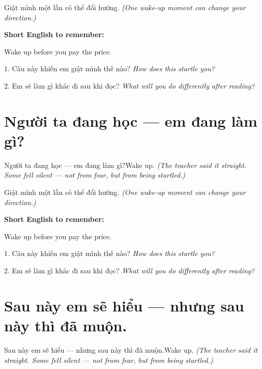 \begin{baihoc}
Giật mình một lần có thể đổi hướng.
\textit{(One wake-up moment can change your direction.)}
\end{baihoc}

\begin{ghinhoanh}
\textbf{Short English to remember:}

Wake up before you pay the price.

\end{ghinhoanh}

\begin{tuhocnhanh}
1. Câu này khiến em giật mình thế nào? \textit{How does this startle you?}

2. Em sẽ làm gì khác đi sau khi đọc? \textit{What will you do differently after reading?}
\end{tuhocnhanh}
\ngancach


\section{Người ta đang học — em đang làm gì?}
\begin{truyen}{Người ta đang học — em đang làm gì?}{Wake up.}
\textit{(The teacher said it straight. Some fell silent — not from fear, but from being startled.)}
\end{truyen}

\begin{baihoc}
Giật mình một lần có thể đổi hướng.
\textit{(One wake-up moment can change your direction.)}
\end{baihoc}

\begin{ghinhoanh}
\textbf{Short English to remember:}

Wake up before you pay the price.

\end{ghinhoanh}

\begin{tuhocnhanh}
1. Câu này khiến em giật mình thế nào? \textit{How does this startle you?}

2. Em sẽ làm gì khác đi sau khi đọc? \textit{What will you do differently after reading?}
\end{tuhocnhanh}
\ngancach


\section{Sau này em sẽ hiểu — nhưng sau này thì đã muộn.}
\begin{truyen}{Sau này em sẽ hiểu — nhưng sau này thì đã muộn.}{Wake up.}
\textit{(The teacher said it straight. Some fell silent — not from fear, but from being startled.)}
\end{truyen}

